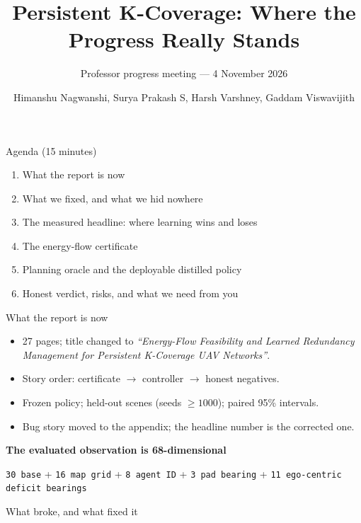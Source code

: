\documentclass[aspectratio=169,10pt]{beamer}
\title{Persistent K-Coverage: Where the Progress Really Stands}
\subtitle{Professor progress meeting --- 4 November 2026}
\author{Himanshu Nagwanshi, Surya Prakash S, Harsh Varshney, Gaddam Viswavijith}
\date{}
\begin{document}
\begin{frame}
  \titlepage
\end{frame}

\begin{frame}{Agenda (15 minutes)}
  \begin{enumerate}
    \item What the report is now
    \item What we fixed, and what we hid nowhere
    \item The measured headline: where learning wins and loses
    \item The energy-flow certificate
    \item Planning oracle and the deployable distilled policy
    \item Honest verdict, risks, and what we need from you
  \end{enumerate}
\end{frame}

\begin{frame}{What the report is now}
  \begin{itemize}
    \item 27 pages; title changed to \emph{``Energy-Flow Feasibility and Learned Redundancy Management for Persistent K-Coverage UAV Networks''}.
    \item Story order: certificate $\rightarrow$ controller $\rightarrow$ honest negatives.
    \item Frozen policy; held-out scenes (seeds $\ge 1000$); paired 95\% intervals.
    \item Bug story moved to the appendix; the headline number is the corrected one.
  \end{itemize}
  \vspace{0.2cm}
  {\scriptsize
  \textbf{The evaluated observation is 68-dimensional}

  \texttt{30 base} + \texttt{16 map grid} + \texttt{8 agent ID}
  + \texttt{3 pad bearing} + \texttt{11 ego-centric deficit bearings}

}
\end{frame}

\begin{frame}{What broke, and what fixed it}
  \begin{center}
  \end{center}
\end{frame}
\end{document}
